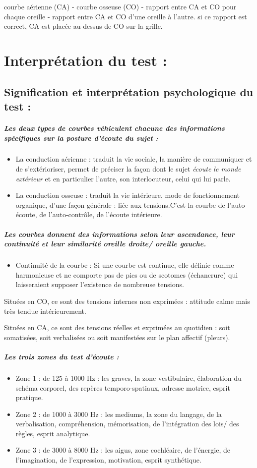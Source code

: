 courbe aérienne (CA) - courbe osseuse (CO) - rapport entre CA et CO
pour chaque oreille - rapport entre CA et CO d\textquoteright une
oreille à l'autre. si ce rapport est correct, CA est placée au-dessus
de CO sur la grille.
\section{Interprétation du test : }

\subsection{Signification et interprétation psychologique du test : }
\subparagraph{Les deux types de courbes véhiculent chacune des informations spécifiques
sur la posture d'écoute du sujet : }
\begin{itemize}
\item La conduction aérienne : traduit la vie sociale, la manière de communiquer
et de s'extérioriser, permet de préciser la façon dont le sujet\emph{
écoute le monde extérieur} et en particulier l\textquoteright autre,
son interlocuteur, celui qui lui parle. 
\item La conduction osseuse : traduit la vie intérieure, mode de fonctionnement
organique, d'une façon générale : liée aux tensions.C'est la courbe
de l\textquoteright auto-écoute, de l\textquoteright auto-contrôle,
de l'écoute intérieure.
\end{itemize}

\subparagraph{Les courbes donnent des informations selon leur ascendance, leur
continuité et leur similarité oreille droite/ oreille gauche.}
\begin{itemize}
\item Continuité de la courbe : Si une courbe est continue, elle définie
comme harmonieuse et ne comporte pas de pics ou de scotomes (échancrure)  qui laisseraient
supposer l'existence de nombreuse tensions.
\end{itemize}
Situées en CO, ce sont des tensions internes non exprimées : attitude
calme mais très tendue intérieurement.

Situées en CA, ce sont des tensions réelles et exprimées au quotidien
: soit somatisées, soit verbalisées ou soit manifestées sur le plan
affectif (pleurs).

\subparagraph{Les trois zones du test d'écoute : }
\begin{itemize}
\item Zone 1 : de 125 à 1000 Hz : les graves, la zone vestibulaire, élaboration
du schéma corporel, des repères temporo-spatiaux, adresse motrice,
esprit pratique.
\item Zone 2 : de 1000 à 3000 Hz : les mediums, la zone du langage, de la
verbalisation, compréhension, mémorisation, de l'intégration des lois/
des règles, esprit analytique.
\item Zone 3 : de 3000 à 8000 Hz : les aigus, zone cochléaire, de l'énergie,
de l'imagination, de l'expression, motivation, esprit synthétique.
\end{itemize}


